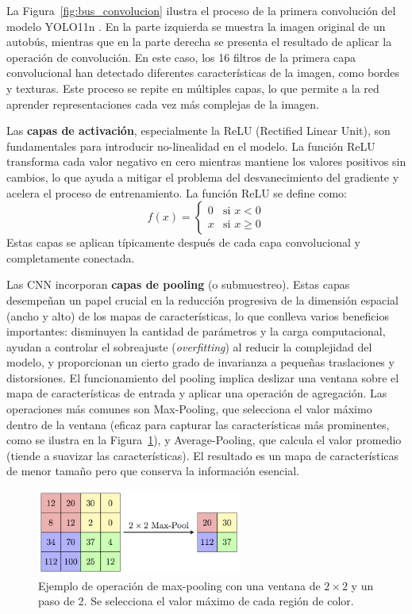 \documentclass[11pt,spanish,listoffigures,listoftables]{tfgetsinf}
\begin{document}
La Figura~\ref{fig:bus_convolucion} ilustra el proceso de la primera convolución del modelo YOLO11n \cite{yolo11_ultralytics}. En la parte izquierda se muestra la imagen original de un autobús, mientras que en la parte derecha se presenta el resultado de aplicar la operación de convolución. En este caso, los 16 filtros de la primera capa convolucional han detectado diferentes características de la imagen, como bordes y texturas. Este proceso se repite en múltiples capas, lo que permite a la red aprender representaciones cada vez más complejas de la imagen.

Las \textbf{capas de activación}, especialmente la ReLU (Rectified Linear Unit), son fundamentales para introducir no-linealidad en el modelo. La función ReLU transforma cada valor negativo en cero mientras mantiene los valores positivos sin cambios, lo que ayuda a mitigar el problema del desvanecimiento del gradiente y acelera el proceso de entrenamiento. La función ReLU se define como:
\begin{equation}
   f(x) = \begin{cases}
      0 & \text{si } x < 0 \\
      x & \text{si } x \geq 0
   \end{cases}
\end{equation}
Estas capas se aplican típicamente después de cada capa convolucional y completamente conectada.

Las CNN incorporan \textbf{capas de pooling} (o submuestreo). Estas capas desempeñan un papel crucial en la reducción progresiva de la dimensión espacial (ancho y alto) de los mapas de características, lo que conlleva varios beneficios importantes: disminuyen la cantidad de parámetros y la carga computacional, ayudan a controlar el sobreajuste (\textit{overfitting}) al reducir la complejidad del modelo, y proporcionan un cierto grado de invarianza a pequeñas traslaciones y distorsiones. El funcionamiento del pooling implica deslizar una ventana sobre el mapa de características de entrada y aplicar una operación de agregación. Las operaciones más comunes son Max-Pooling, que selecciona el valor máximo dentro de la ventana (eficaz para capturar las características más prominentes, como se ilustra en la Figura~\ref{fig:pooling}), y Average-Pooling, que calcula el valor promedio (tiende a suavizar las características). El resultado es un mapa de características de menor tamaño pero que conserva la información esencial.

\begin{figure}[H]
   \centering
   \includegraphics[width=0.6\textwidth]{images/estado_del_arte/max_pooling.png}
   \caption{Ejemplo de operación de max-pooling con una ventana de $2 \times 2$ y un paso de 2. Se selecciona el valor máximo de cada región de color.}
   \label{fig:pooling}
\end{figure}
\end{document}
